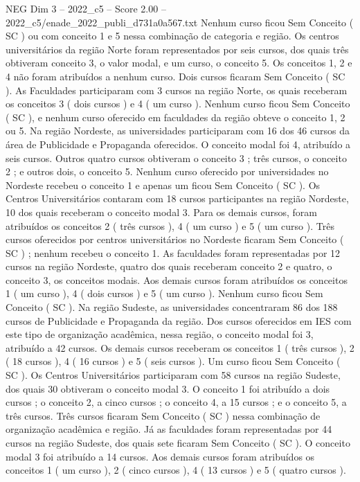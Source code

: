 \begin{textsample}{NEG Dim 3 – 2022\_c5 – Score 2.00 – 2022\_c5/enade\_2022\_publi\_d731a0a567.txt}
Nenhum curso ficou Sem Conceito ( SC ) ou com conceito 1 e 5 nessa combinação de categoria e região.
Os centros universitários da região Norte foram representados por seis cursos, dos quais três obtiveram conceito 3, o valor modal, e um curso, o conceito 5.
Os conceitos 1, 2 e 4 não foram atribuídos a nenhum curso.
Dois cursos ficaram Sem Conceito ( SC ).
As Faculdades participaram com 3 cursos na região Norte, os quais receberam os conceitos 3 ( dois cursos ) e 4 ( um curso ).
Nenhum curso ficou Sem Conceito ( SC ), e nenhum curso oferecido em faculdades da região obteve o conceito 1, 2 ou 5.
Na região Nordeste, as universidades participaram com 16 dos 46 cursos da área de Publicidade e Propaganda oferecidos.
O conceito modal foi 4, atribuído a seis cursos.
Outros quatro cursos obtiveram o conceito 3 ; três cursos, o conceito 2 ; e outros dois, o conceito 5.
Nenhum curso oferecido por universidades no Nordeste recebeu o conceito 1 e apenas um ficou Sem Conceito ( SC ).
Os Centros Universitários contaram com 18 cursos participantes na região Nordeste, 10 dos quais receberam o conceito modal 3.
Para os demais cursos, foram atribuídos os conceitos 2 ( três cursos ), 4 ( um curso ) e 5 ( um curso ).
Três cursos oferecidos por centros universitários no Nordeste ficaram Sem Conceito ( SC ) ; nenhum recebeu o conceito 1.
As faculdades foram representadas por 12 cursos na região Nordeste, quatro dos quais receberam conceito 2 e quatro, o conceito 3, os conceitos modais.
Aos demais cursos foram atribuídos os conceitos 1 ( um curso ), 4 ( dois cursos ) e 5 ( um curso ).
Nenhum curso ficou Sem Conceito ( SC ).
Na região Sudeste, as universidades concentraram 86 dos 188 cursos de Publicidade e Propaganda da região.
Dos cursos oferecidos em IES com este tipo de organização acadêmica, nessa região, o conceito modal foi 3, atribuído a 42 cursos.
Os demais cursos receberam os conceitos 1 ( três cursos ), 2 ( 18 cursos ), 4 ( 16 cursos ) e 5 ( seis cursos ).
Um curso ficou Sem Conceito ( SC ).
Os Centros Universitários participaram com 58 cursos na região Sudeste, dos quais 30 obtiveram o conceito modal 3.
O conceito 1 foi atribuído a dois cursos ; o conceito 2, a cinco cursos ; o conceito 4, a 15 cursos ; e o conceito 5, a três cursos.
Três cursos ficaram Sem Conceito ( SC ) nessa combinação de organização acadêmica e região.
Já as faculdades foram representadas por 44 cursos na região Sudeste, dos quais sete ficaram Sem Conceito ( SC ).
O conceito modal 3 foi atribuído a 14 cursos.
Aos demais cursos foram atribuídos os conceitos 1 ( um curso ), 2 ( cinco cursos ), 4 ( 13 cursos ) e 5 ( quatro cursos ).

\end{textsample}
